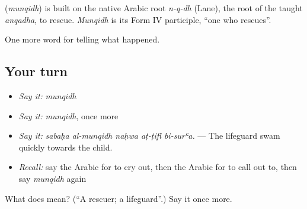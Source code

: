 \begin{cousinweb}
\textbf{} (\emph{munqidh}) is built on the native Arabic root \emph{n-q-dh} (Lane), the root of the taught \emph{anqadha}, to rescue. \emph{Munqidh} is its Form IV participle, \textquotedblleft{}one who rescues\textquotedblright{}.
\end{cousinweb}

\begin{grammarlens}[title={What you've built}]
One more word for telling what happened.
\end{grammarlens}

\subsection*{Your turn}
\begin{itemize}
\raggedright
  \item \emph{Say it:} \emph{munqidh}
  \item \emph{Say it:} \emph{munqidh}, once more
  \item \emph{Say it:} \emph{sabaḥa al-munqidh naḥwa aṭ-ṭifl bi-surʿa.} — The lifeguard swam quickly towards the child.
  \item \emph{Recall:} say the Arabic for to cry out, then the Arabic for to call out to, then say \emph{munqidh} again
\end{itemize}

\begin{tcolorbox}[breakable,colback=teal!4,colframe=teal!35!black,title={Before you move on}]
What does  mean? (\textquotedblleft{}A rescuer; a lifeguard\textquotedblright{}.) Say it once more.
\end{tcolorbox}
